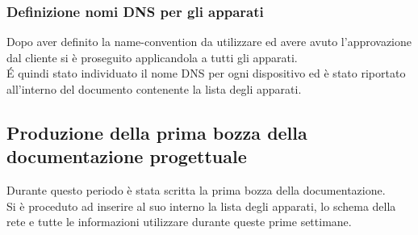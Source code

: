 \documentclass[Realizzazione.tex]{subfiles}
\begin{document}
\subsubsection{Definizione nomi DNS per gli apparati}
Dopo aver definito la name-convention da utilizzare ed avere avuto l'approvazione dal cliente si è proseguito applicandola a tutti gli apparati. \\
\'E quindi stato individuato il nome DNS per ogni dispositivo ed è stato riportato all'interno del documento contenente la lista degli apparati.

\subsection{Produzione della prima bozza della documentazione progettuale}
Durante questo periodo è stata scritta la prima bozza della documentazione. \\
Si è proceduto ad inserire al suo interno la lista degli apparati, lo schema della rete e tutte le informazioni utilizzare durante queste prime settimane.
\end{document}
